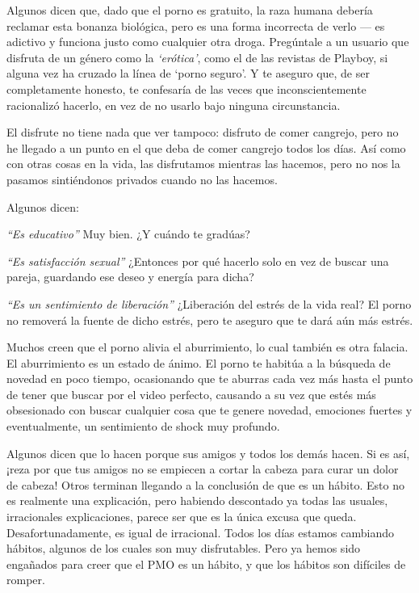 \documentclass[
  spanish,
  openany]{book}
\begin{document}
Algunos dicen que, dado que el porno es gratuito, la raza humana debería reclamar esta bonanza biológica, pero es una forma incorrecta de verlo --- es adictivo y funciona justo como cualquier otra droga. Pregúntale a un usuario que disfruta de un género como la \emph{`erótica'}, como el de las revistas de Playboy, si alguna vez ha cruzado la línea de `porno seguro'. Y te aseguro que, de ser completamente honesto, te confesaría de las veces que inconscientemente racionalizó hacerlo, en vez de no usarlo bajo ninguna circunstancia.

El disfrute no tiene nada que ver tampoco: disfruto de comer cangrejo, pero no he llegado a un punto en el que deba de comer cangrejo todos los días. Así como con otras cosas en la vida, las disfrutamos mientras las hacemos, pero no nos la pasamos sintiéndonos privados cuando no las hacemos.

Algunos dicen:

\emph{``Es educativo''} Muy bien. ¿Y cuándo te gradúas?

\emph{``Es satisfacción sexual''} ¿Entonces por qué hacerlo solo en vez de buscar una pareja, guardando ese deseo y energía para dicha?

\emph{``Es un sentimiento de liberación''} ¿Liberación del estrés de la vida real? El porno no removerá la fuente de dicho estrés, pero te aseguro que te dará aún más estrés.

Muchos creen que el porno alivia el aburrimiento, lo cual también es otra falacia. El aburrimiento es un estado de ánimo. El porno te habitúa a la búsqueda de novedad en poco tiempo, ocasionando que te aburras cada vez más hasta el punto de tener que buscar por el video perfecto, causando a su vez que estés más obsesionado con buscar cualquier cosa que te genere novedad, emociones fuertes y eventualmente, un sentimiento de shock muy profundo.

Algunos dicen que lo hacen porque sus amigos y todos los demás hacen. Si es así, ¡reza por que tus amigos no se empiecen a cortar la cabeza para curar un dolor de cabeza! Otros terminan llegando a la conclusión de que es un hábito. Esto no es realmente una explicación, pero habiendo descontado ya todas las usuales, irracionales explicaciones, parece ser que es la única excusa que queda. Desafortunadamente, es igual de irracional. Todos los días estamos cambiando hábitos, algunos de los cuales son muy disfrutables. Pero ya hemos sido engañados para creer que el PMO es un hábito, y que los hábitos son difíciles de romper.
\end{document}
